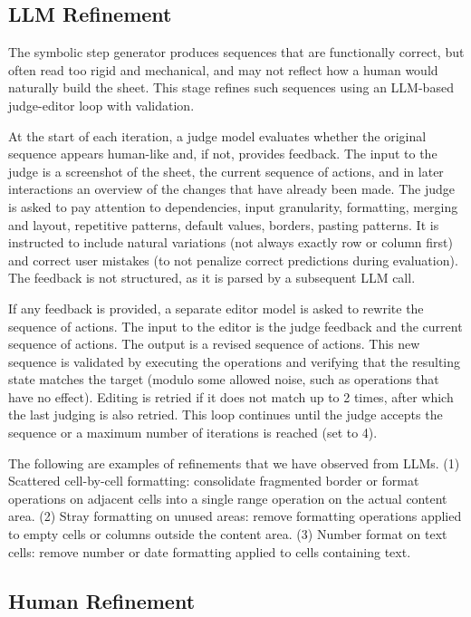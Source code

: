 \documentclass{article}
\theoremstyle{plain}
\theoremstyle{definition}
\theoremstyle{remark}
\begin{document}
\subsection{LLM Refinement}

The symbolic step generator produces sequences that are functionally correct, but often read too rigid and mechanical, and may not reflect how a human would naturally build the sheet.
This stage refines such sequences using an LLM-based judge-editor loop with validation.

At the start of each iteration, a judge model evaluates whether the original sequence appears human-like and, if not, provides feedback.
The input to the judge is a screenshot of the sheet, the current sequence of actions, and in later interactions an overview of the changes that have already been made.
The judge is asked to pay attention to dependencies, input granularity, formatting, merging and layout, repetitive patterns, default values, borders, pasting patterns.
It is instructed to include natural variations (not always exactly row or column first) and correct user mistakes (to not penalize correct predictions during evaluation).
The feedback is not structured, as it is parsed by a subsequent LLM call.%

If any feedback is provided, a separate editor model is asked to rewrite the sequence of actions.
The input to the editor is the judge feedback and the current sequence of actions.
The output is a revised sequence of actions.
This new sequence is validated by executing the operations and verifying that the resulting state matches the target (modulo some allowed noise, such as operations that have no effect).
Editing is retried if it does not match up to 2 times, after which the last judging is also retried.
This loop continues until the judge accepts the sequence or a maximum number of iterations is reached (set to 4).

The following are examples of refinements that we have observed from LLMs. 
(1) Scattered cell-by-cell formatting: consolidate fragmented border or format operations on adjacent cells into a single range operation on the actual content area.
(2) Stray formatting on unused areas: remove formatting operations applied to empty cells or columns outside the content area.
(3) Number format on text cells: remove number or date formatting applied to cells containing text.

\subsection{Human Refinement} 
\end{document}
